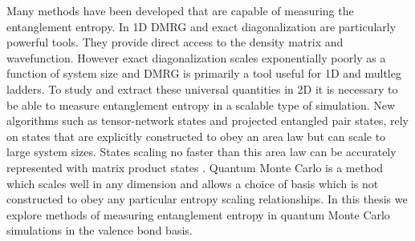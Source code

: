 Many methods have been developed that are capable of measuring the entanglement entropy. In 1D DMRG and exact diagonalization are particularly powerful tools. They provide direct access to the density matrix and wavefunction. However exact diagonalization scales exponentially poorly as a function of system size and DMRG is primarily a tool useful for 1D and multleg ladders. To study and extract these universal quantities in 2D it is necessary to be able to measure entanglement entropy in a scalable type of simulation. New algorithms such as tensor-network states and projected entangled pair states, rely on states that are explicitly constructed to obey an area law \cite{PEPS1,PEPS2} but can scale to large system sizes. States scaling no faster than this area law can be accurately represented with matrix product states \cite{MPS_DMRG}. Quantum Monte Carlo is a method which scales well in any dimension and allows a choice of basis which is not constructed to obey any particular entropy scaling relationships. In this thesis we explore methods of measuring entanglement entropy in quantum Monte Carlo simulations in the valence bond basis.


